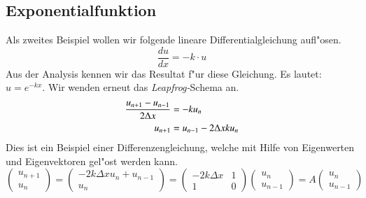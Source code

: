 \begin{refsection}
\subsection{Exponentialfunktion}
Als zweites Beispiel wollen wir folgende lineare Differentialgleichung
aufl"osen. 
\begin{equation}
	\frac{d u }{dx} = -k \cdot u
\end{equation} 
Aus der Analysis kennen wir das Resultat f"ur diese Gleichung. Es lautet:
$u = e^{-kx}$. Wir wenden erneut das \textit{Leapfrog-}Schema an.
\begin{align}
	\frac{u_{n+1} - u_{n-1}}{2 \Delta x} &= -k u_n  \notag\\
	u_{n+1}& = u_{n-1} - 2 \Delta x k u_n
	\label{stosswellen:cm_bsp2}
\end{align}
Dies ist ein Beispiel einer Differenzengleichung, welche mit Hilfe von
Eigenwerten und Eigenvektoren gel"ost werden kann. \cite{stoss:linAlg} 
\begin{equation}
	\begin{pmatrix}u_{n+1}\\u_n\end{pmatrix}
	=
	\begin{pmatrix}-2k\Delta x u_n+u_{n-1}\\u_n\end{pmatrix}
	=
	\begin{pmatrix}
	-2k \Delta x & 1 \\
	1 & 0
	\end{pmatrix}
	\begin{pmatrix}u_n\\u_{n-1}\end{pmatrix}
	=
	A
	\begin{pmatrix}u_n\\u_{n-1}\end{pmatrix}
	\label{fibonaccirekursion}
\end{equation}


\end{refsection}
